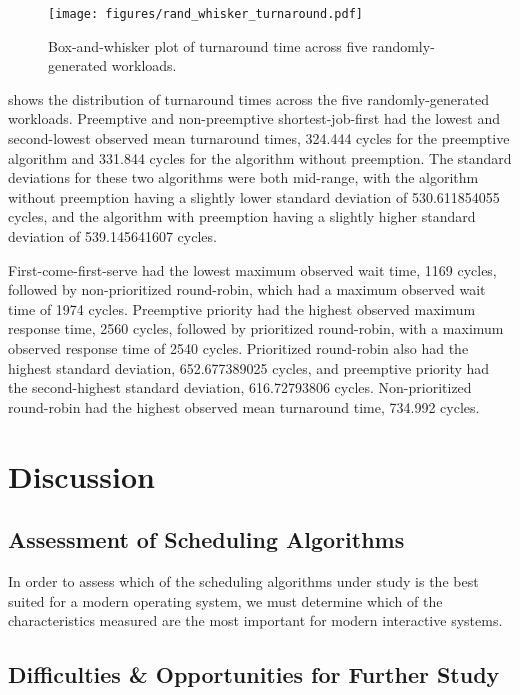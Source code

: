 \documentclass[12pt,letterpaper]{article}
\begin{document}
			\begin{figure}[H]
				\centerline{\texttt{[image: figures/rand\_whisker\_turnaround.pdf]}}
				\caption{Box-and-whisker plot of turnaround time across five randomly-generated workloads.}
				\label{fig:rand_whisker_turn}
			\end{figure}

			 shows the distribution of turnaround times across the five randomly-generated workloads. Preemptive and non-preemptive shortest-job-first had the lowest and second-lowest observed mean turnaround times, 324.444 cycles for the preemptive algorithm and 331.844 cycles for the algorithm without preemption. The standard deviations for these two algorithms were both mid-range, with the algorithm without preemption having a slightly lower standard deviation of 530.611854055 cycles, and the algorithm with preemption having a slightly higher standard deviation of 539.145641607 cycles.

			First-come-first-serve had the lowest maximum observed wait time, 1169 cycles, followed by non-prioritized round-robin, which had a maximum observed wait time of 1974 cycles. Preemptive priority had the highest observed maximum response time, 2560 cycles, followed by prioritized round-robin, with a maximum observed response time of 2540 cycles. Prioritized round-robin also had the highest standard deviation, 652.677389025 cycles, and preemptive priority had the second-highest standard deviation, 616.72793806 cycles. Non-prioritized round-robin had the highest observed mean turnaround time, 734.992 cycles.

  	\section{Discussion}

  		\subsection{Assessment of Scheduling Algorithms}

  			In order to assess which of the scheduling algorithms under study is the best suited for a modern operating system, we must determine which of the characteristics measured are the most important for modern interactive systems. 

  		\subsection{Difficulties \& Opportunities for Further Study}
\end{document}
